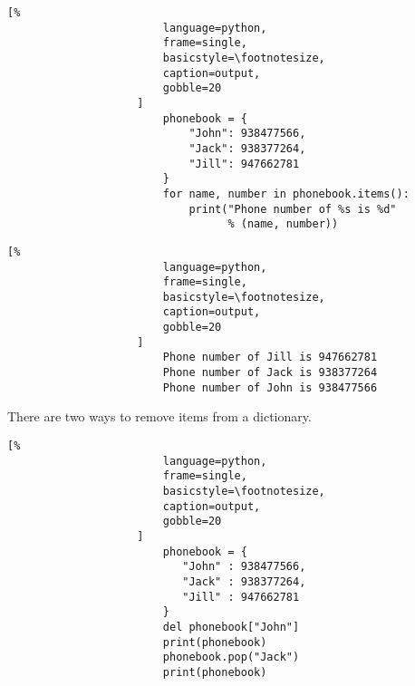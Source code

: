 \documentclass[crop=false,class=book,oneside]{standalone}
\begin{document}
                \begin{minipage}[t]{.48\textwidth}
                    \centering
                    \begin{lstlisting}[%
                        language=python,
                        frame=single,
                        basicstyle=\footnotesize,
                        caption=output,
                        gobble=20
                    ]
                        phonebook = {
                            "John": 938477566,
                            "Jack": 938377264,
                            "Jill": 947662781
                        }
                        for name, number in phonebook.items():
                            print("Phone number of %s is %d"
                                  % (name, number))
                    \end{lstlisting}
                \end{minipage}\hfill
                \begin{minipage}[t]{.48\textwidth}
                    \centering
                    \begin{lstlisting}[%
                        language=python,
                        frame=single,
                        basicstyle=\footnotesize,
                        caption=output,
                        gobble=20
                    ]
                        Phone number of Jill is 947662781
                        Phone number of Jack is 938377264
                        Phone number of John is 938477566
                    \end{lstlisting}
                \end{minipage}
                There are two ways to remove items from a
                dictionary.\newline
                \begin{minipage}[t]{.48\textwidth}
                    \centering
                    \begin{lstlisting}[%
                        language=python,
                        frame=single,
                        basicstyle=\footnotesize,
                        caption=output,
                        gobble=20
                    ]
                        phonebook = {
                           "John" : 938477566,
                           "Jack" : 938377264,
                           "Jill" : 947662781
                        }
                        del phonebook["John"]
                        print(phonebook)
                        phonebook.pop("Jack")
                        print(phonebook)
                    \end{lstlisting}
                \end{minipage}\hfill
\end{document}
